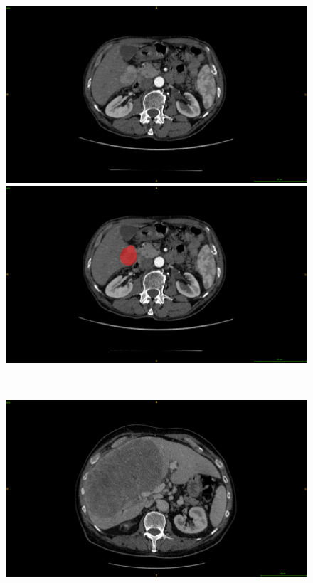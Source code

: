\documentclass[]{article}
\begin{document}
\begin{figure}[!ht]
	\centering
	\begin{minipage}{0.45\linewidth}
		\includegraphics[width=\linewidth]{../Contributions/images/ResizeGDB_examplePatientSmallTumor}
	\end{minipage} \hspace{-0.1cm}
	\begin{minipage}{0.45\linewidth}
		\includegraphics[width=\linewidth]{../Contributions/images/ResizeGDB_examplePatientSmallTumor_seg}
	\end{minipage} \\
	\begin{minipage}{0.45\linewidth}
		\includegraphics[width=\linewidth]{../Contributions/images/ResizeGDB_examplePatientLargeTumor}

\end{minipage}
\end{figure}
\end{document}
